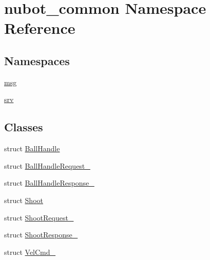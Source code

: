 \hypertarget{namespacenubot__common}{\section{nubot\-\_\-common Namespace Reference}
\label{namespacenubot__common}
}
\subsection*{Namespaces}
\begin{DoxyCompactItemize}
\item 
\hyperlink{namespacenubot__common_1_1msg}{msg}
\item 
\hyperlink{namespacenubot__common_1_1srv}{srv}
\end{DoxyCompactItemize}
\subsection*{Classes}
\begin{DoxyCompactItemize}
\item 
struct \hyperlink{structnubot__common_1_1BallHandle}{Ball\-Handle}
\item 
struct \hyperlink{structnubot__common_1_1BallHandleRequest__}{Ball\-Handle\-Request\-\_\-}
\item 
struct \hyperlink{structnubot__common_1_1BallHandleResponse__}{Ball\-Handle\-Response\-\_\-}
\item 
struct \hyperlink{structnubot__common_1_1Shoot}{Shoot}
\item 
struct \hyperlink{structnubot__common_1_1ShootRequest__}{Shoot\-Request\-\_\-}
\item 
struct \hyperlink{structnubot__common_1_1ShootResponse__}{Shoot\-Response\-\_\-}
\item 
struct \hyperlink{structnubot__common_1_1VelCmd__}{Vel\-Cmd\-\_\-}
\end{DoxyCompactItemize}

